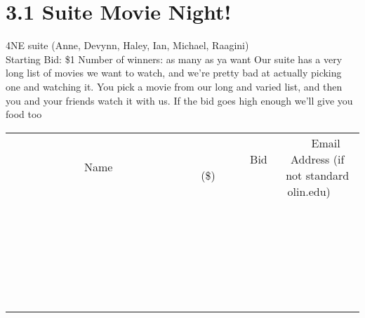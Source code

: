 \documentclass[11pt]{article}
\begin{document}
\section*{3.1 Suite Movie Night!}
4NE suite (Anne, Devynn, Haley, Ian, Michael, Raagini)
\\
Starting Bid: \$1
\newline
Number of winners: as many as ya want
\newline
Our suite has a very long list of movies we want to watch, and we're pretty bad at actually picking one and watching it.  You pick a movie from our long and varied list, and then you and your friends watch it with us.  If the bid goes high enough we'll give you food too
\\[6ex]
\begin{tabular}{c c c}
~~~~~~~~~~~~~Name~~~~~~~~~~~~~ & ~~~~~~~~~Bid (\$)~~~~~~~~~  & ~~~Email Address (if not standard olin.edu)~~~\\
 & & \\
\hline
 & & \\
\hline
 & & \\
\hline
 & & \\
\hline
 & & \\
\hline
 & & \\
\hline
 & & \\
\hline
 & & \\
\hline
 & & \\
\hline
 & & \\
\hline
 & & \\
\hline
 & & \\
\hline
 & & \\
\hline
 & & \\
\hline
 & & \\
\hline
 & & \\
\hline
 & & \\
\hline
 & & \\
\hline
 & & \\
\hline
 & & \\
\hline
 & & \\
\hline
 & & \\
\hline
 & & \\
\hline
 & & \\
\hline
 & & \\
\hline
 & & \\
\hline
\end{tabular}
\newpage
\end{document}
